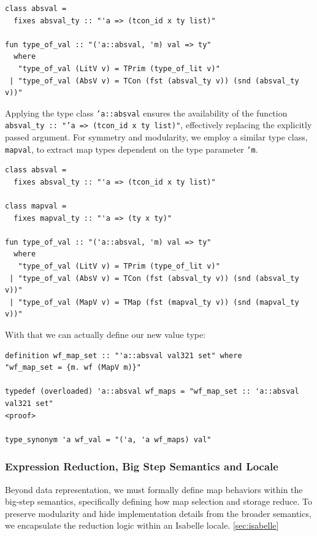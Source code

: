 \documentclass[11pt]{article}
\begin{document}
\begin{verbatim}
class absval =
  fixes absval_ty :: "'a => (tcon_id x ty list)"

fun type_of_val :: "('a::absval, 'm) val => ty"
  where
   "type_of_val (LitV v) = TPrim (type_of_lit v)"
 | "type_of_val (AbsV v) = TCon (fst (absval_ty v)) (snd (absval_ty v))"
\end{verbatim}

Applying the type class \texttt{'a::absval} ensures the availability of the function \texttt{absval\_ty :: "'a => (tcon\_id x ty list)"},
effectively replacing the explicitly passed argument.
For symmetry and modularity, we employ a similar type class, \texttt{mapval},
to extract map types dependent on the type parameter \texttt{'m}.

\begin{verbatim}
class absval =
  fixes absval_ty :: "'a => (tcon_id x ty list)"

class mapval =
  fixes mapval_ty :: "'a => (ty x ty)"

fun type_of_val :: "('a::absval, 'm) val => ty"
  where
   "type_of_val (LitV v) = TPrim (type_of_lit v)"
 | "type_of_val (AbsV v) = TCon (fst (absval_ty v)) (snd (absval_ty v))"
 | "type_of_val (MapV v) = TMap (fst (mapval_ty v)) (snd (mapval_ty v))"
\end{verbatim}

With that we can actually define our new value type:

\begin{verbatim}
definition wf_map_set :: "'a::absval val321 set" where
"wf_map_set = {m. wf (MapV m)}"

typedef (overloaded) 'a::absval wf_maps = "wf_map_set :: 'a::absval val321 set"
<proof>

type_synonym 'a wf_val = "('a, 'a wf_maps) val"
\end{verbatim}


\subsubsection{Expression Reduction, Big Step Semantics and Locale}

Beyond data representation, we must formally define map behaviors within the big-step semantics,
specifically defining how map selection and storage reduce.
To preserve modularity and hide implementation details from the broader semantics,
we encapsulate the reduction logic within an Isabelle locale. \ref{sec:isabelle}
\end{document}
